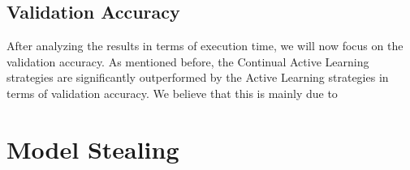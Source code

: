 \subsection{Validation Accuracy}
\label{sec:Discussion:ValidationAccuracy}
After analyzing the results in terms of execution time, we will now focus on the validation accuracy. As mentioned before, the Continual Active Learning strategies are significantly outperformed by the Active Learning strategies in terms of validation accuracy. We believe
that this is mainly due to

\section{Model Stealing}
\label{sec:Discussion:ModelStealing}

